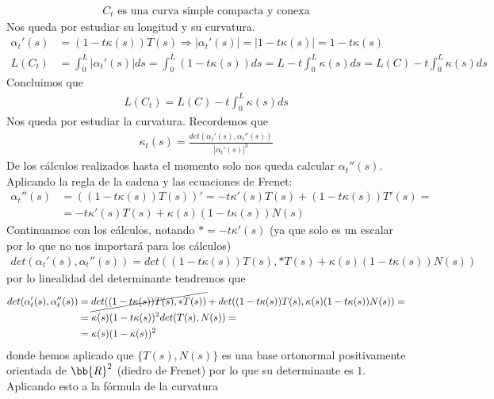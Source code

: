 \begin{ejercicio}
\begin{solucion}
        \begin{gather*}
            \boxed{C_t \text{ es una curva simple compacta y conexa}}
        \end{gather*}
        Nos queda por estudiar su longitud y su curvatura.
        \begin{align*}
            \alpha_t'(s) &= (1-t\kappa(s))T(s) \Rightarrow |\alpha_t'(s)| = |1-t\kappa(s)| = 1-t\kappa(s)\\[1.25em]
            L(C_t) &= \int_0^L |\alpha_t'(s)| ds = \int_0^L (1-t\kappa(s))ds = L - t\int_0^L\kappa(s) ds = L(C) - t\int_0^L \kappa(s) ds
        \end{align*}
        Concluimos que 
        \begin{gather*}
            \boxed{L(C_t) = L(C) - t\int_0^L \kappa(s) ds}
        \end{gather*}
        Nos queda por estudiar la curvatura. Recordemos que 
        \begin{gather*}
            \kappa_t(s) = \frac{det(\alpha_t'(s), \alpha_t''(s))}{|\alpha_t'(s)|^3}
        \end{gather*}
        De los cálculos realizados hasta el momento solo nos queda calcular $\alpha_t''(s)$. Aplicando la regla de la cadena y las ecuaciones de Frenet:
        \begin{align*}
            \alpha_t''(s) &= ((1-t\kappa(s))T(s))' = -t\kappa'(s)T(s) + (1-t\kappa(s))T'(s) = \\
            &= -t\kappa'(s)T(s) + \kappa(s)(1-t\kappa(s))N(s)
        \end{align*}
        Continuamos con los cálculos, notando $\ast = -t\kappa'(s)$ (ya que solo es un escalar por lo que no nos importará para los cálculos)
        \begin{gather*}
            det(\alpha_t'(s),\alpha_t''(s)) = det((1-t\kappa(s))T(s), \ast T(s) + \kappa(s)(1-t\kappa(s))N(s))
        \end{gather*}
        por lo linealidad del determinante tendremos que 
        \begin{align*}
            det(\alpha_t'(s),\alpha_t''(s)) &= \cancel{det((1-t\kappa(s))T(s), \ast T(s) )} + det((1-t\kappa(s))T(s), \kappa(s)(1-t\kappa(s))N(s)) =\\
            &= \kappa(s)(1-t\kappa(s))^2det(T(s),N(s)) =\\
            &= \kappa(s)(1-\kappa(s))^2
        \end{align*}
        donde hemos aplicado que $\{T(s), N(s)\}$ es una base ortonormal positivamente orientada de $\bb{R}^2$ (diedro de Frenet) por lo que su determinante es $1$. Aplicando esto a la fórmula de la curvatura

\end{solucion}
\end{ejercicio}
